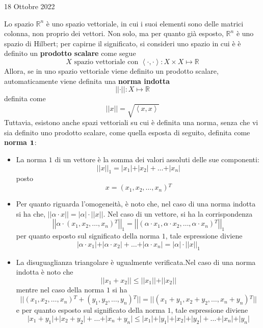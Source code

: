 \documentclass[a4paper]{extarticle}
\begin{document}
\newpage
\begin{center}
    18 Ottobre 2022
\end{center}
Lo spazio $\mathbb{R}^n$ è uno spazio vettoriale, in cui i suoi elementi sono delle matrici colonna, non proprio dei vettori. Non solo, ma per quanto già esposto, $\mathbb{R}^n$ è uno spazio di Hilbert; per capirne il significato, si consideri uno spazio in cui è è definito un \textbf{prodotto scalare} come segue
\[X \text{ spazio vettoriale con } \left<\cdot,\cdot\right> : X \times X \longmapsto \mathbb{R}\]
Allora, se in uno spazio vettoriale viene definito un prodotto scalare, automaticamente viene definita una \textbf{norma indotta}
\[\left \vert \left \vert \cdot \right \vert \right \vert : X \longmapsto \mathbb{R}\]
definita come
\[\left \vert \left \vert x \right \vert \right \vert = \sqrt{\left<x,x\right>}\]
Tuttavia, esistono anche spazi vettoriali su cui è definita una norma, senza che vi sia definito uno prodotto scalare, come quella esposta di seguito, definita come \textbf{norma $\bf{1}$}: 
\begin{itemize}
    \item La norma $1$ di un vettore è la somma dei valori assoluti delle sue componenti:
    \[\left \vert \left \vert x \right \vert \right \vert_1 = \vert x_1 \vert + \vert x_2 \vert + \dots + \vert x_n \vert\]
    posto
    \[x=(x_1,x_2,\dots,x_n){^T}\]
    \item Per quanto riguarda l'omogeneità, è noto che, nel caso di una norma indotta si ha che, $\left \vert \left \vert \alpha \cdot x \right \vert \right \vert = \vert \alpha \vert \cdot \left \vert \left \vert x \right \vert \right \vert$. Nel caso di un vettore, si ha la corrispondenza
    \[\left \vert \left \vert \alpha \cdot (x_1,x_2,\dots,x_n){^T} \right \vert \right \vert_1 = \left \vert \left \vert (\alpha \cdot x_1, \alpha \cdot x_2, \dots, \alpha \cdot x_n){^T} \right \vert \right \vert_1\]
    per quanto esposto sul significato della norma $1$, tale espressione diviene
    \[\vert \alpha \cdot x_1 \vert + \vert \alpha \cdot x_2 \vert + \dots + \vert \alpha \cdot x_n \vert = \vert \alpha \vert \cdot \left \vert \left \vert x \right \vert \right \vert_1\]
    \item La disuguaglianza triangolare è ugualmente verificata.Nel caso di una norma indotta è noto che
    \[\vert \vert x_1 + x_2 \vert \vert \leq \vert \vert x_1 \vert \vert + \vert \vert x_2 \vert \vert\]
    mentre nel caso della norma $1$ si ha
    \[\vert \vert (x_1,x_2,\dots,x_n){^T} + (y_1,y_2,\dots,y_n){^T} \vert \vert = \vert \vert (x_1+y_1,x_2+y_2,\dots,x_n+y_n){^T} \vert \vert\]
    e per quanto esposto sul significato della norma $1$, tale espressione diviene
    \[\vert x_1+y_1 \vert + \vert x_2 + y_2 \vert + \dots + \vert x_n + y_n \vert \leq \vert x_1 \vert + \vert y_1 \vert + \vert x_2 \vert + \vert y_2 \vert + \dots + \vert x_n \vert + \vert y_n \vert\]
\end{itemize}
\end{document}
